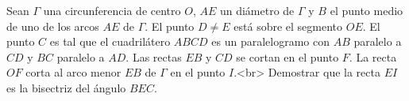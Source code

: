 Sean $\Gamma$ una circunferencia de centro $O$, $AE$ un diámetro de $\Gamma$ y $B$ el punto medio de uno de los arcos $AE$ de $\Gamma$. El punto $D \neq E$ está sobre el segmento $OE$. El punto $C$ es tal que el cuadrilátero $ABCD$ es un paralelogramo con $AB$ paralelo a $CD$ y $BC$ paralelo a $AD$. Las rectas $EB$ y $CD$ se cortan en el punto $F$. La recta $OF$ corta al arco menor $EB$ de $\Gamma$ en el punto $I$.<br>
Demostrar que la recta $EI$ es la bisectriz del ángulo $BEC$.
